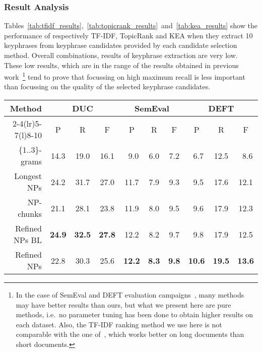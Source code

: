     \subsubsection{Result Analysis}
    \label{subsubsec:candidate_extraction_result_analysis}
      Tables~\ref{tab:tfidf_results},~\ref{tab:topicrank_results}~and~\ref{tab:kea_results}
      show the performance of respectively TF-IDF, TopicRank and KEA when
      they extract 10 keyphrases from keyphrase candidates provided by each
      candidate selection method. Overall combinations, results of keyphrase
      extraction are very low. These low results, which are in the range of the
      results obtained in previous
      work~\cite{hassan2010conundrums,kim2010semeval,paroubek2012deft}\footnote{In
      the case of SemEval and DEFT evaluation
      campaigns~\cite{kim2010semeval,paroubek2012deft}, many methods may have
      better results than ours, but what we present here are pure methods,
      i.e.~no parameter tuning has been done to obtain higher results on each
      dataset. Also, the TF-IDF ranking method we use here is not comparable with
      the one of~, which works better on long documents
      than short documents.} tend to
      prove that focussing on high maximum recall is less important than
      focussing on the quality of the selected keyphrase candidates.
      \begin{table*}
        \centering
        \begin{tabular}{@{}rccccccccc@{}}
          \toprule
          \multirow{2}{*}[-2pt]{\textbf{Method}} & \multicolumn{3}{c}{\textbf{DUC}} & \multicolumn{3}{c}{\textbf{SemEval}} & \multicolumn{3}{c}{\textbf{DEFT}}\\
          \cmidrule(r){2-4}\cmidrule(lr){5-7}\cmidrule(l){8-10}
          & P & R & F & P & R & F & P & R & F\\
          \midrule
          \{1..3\}-grams & 14.3 & 19.0 & 16.1 & $~~$9.0 & $~~$6.0 & $~~$7.2 & $~~$6.7 & 12.5 & $~~$8.6\\
          Longest NPs & 24.2 & 31.7 & 27.0 & 11.7 & $~~$7.9 & $~~$9.3 & $~~$9.5 & 17.6 & 12.1\\
          NP-chunks & 21.1 & 28.1 & 23.8 & 11.9 & $~~$8.0 & $~~$9.5 & $~~$9.6 & 17.9 & 12.3\\
          Refined NPs BL & \textbf{24.9} & \textbf{32.5} & \textbf{27.8} & 12.2 & $~~$8.2 & $~~$9.7 & $~~$9.8 & 17.9 & 12.5\\
          Refined NPs & 22.8 & 30.3 & 25.6 & \textbf{12.2} & \textbf{$~~$8.3} & \textbf{$~~$9.8} & \textbf{10.6} & \textbf{19.5} & \textbf{13.6}\\
          \bottomrule
        \end{tabular}
        \caption{Comparison of candidate selection methods, when 10 keyphrases
                 are extracted by \textbf{TF-IDF}.
                 \label{tab:tfidf_results}}
      \end{table*}
